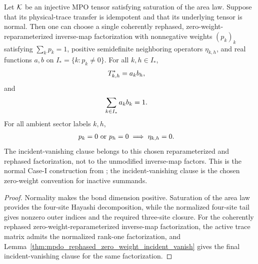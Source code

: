 \begin{lemma}
    \label{thm:mpdo_casei_rephased_inverse_map_coefficient_witness}
    \leanok
    Let ${\cal K}$ be an injective MPO tensor satisfying saturation of the area law.
    Suppose that its physical-trace transfer is idempotent and that
    its underlying tensor is normal. Then one can choose a single coherently
    rephased, zero-weight-reparameterized inverse-map factorization with
    nonnegative weights $(p_k)_k$ satisfying $\sum_kp_k=1$, positive
    semidefinite neighboring operators $\eta_{k,h}$, and real functions
    $a,b$ on $I_*=\{k:p_k\ne0\}$. For all $k,h\in I_*$,
    \begin{align}
        T^*_{k,h} & =a_kb_h,
        \notag
    \end{align}
    and
    \begin{align}
        \sum_{k\in I_*}a_kb_k & =1.
        \notag
    \end{align}
    For all ambient sector labels $k,h$,
    \begin{align}
        p_k=0\ \text{or}\ p_h=0 & \implies \eta_{k,h}=0.
        \notag
    \end{align}
    The incident-vanishing clause belongs to this chosen reparameterized and
    rephased factorization, not to the unmodified inverse-map factors. This is the
    normal Case-I construction from
    \cite[Appendix~C.2, Case~I, Lemmas~C.4--C.5,
        lines~1374--1505]{Cirac2016MPDO_arXiv}; the incident-vanishing clause is the
    chosen zero-weight convention for inactive summands.
\end{lemma}

\begin{proof}
    \leanok
    Normality makes the bond dimension positive. Saturation of the area law provides
    the four-site Hayashi decomposition, while the normalized four-site tail
    gives nonzero outer indices and the required three-site closure. For the
    coherently rephased zero-weight-reparameterized inverse-map factorization,
    the active trace matrix admits the normalized rank-one factorization, and
    Lemma~\ref{thm:mpdo_rephased_zero_weight_incident_vanish} gives the final
    incident-vanishing clause for the same factorization.
\end{proof}

